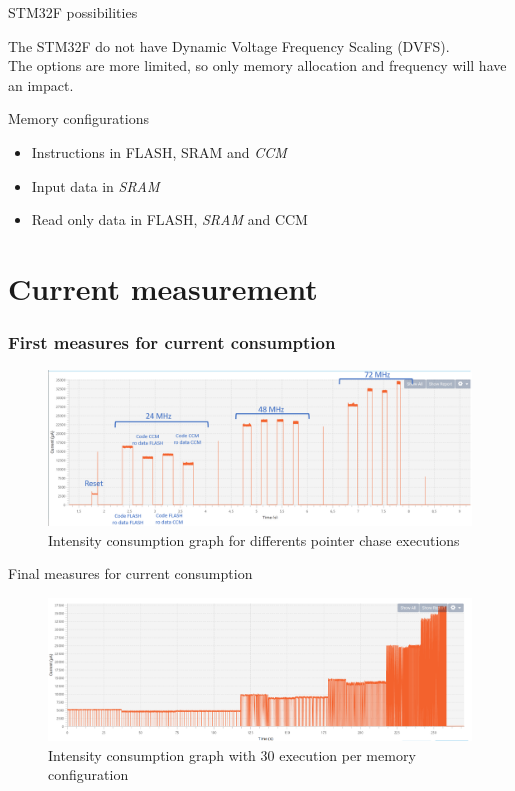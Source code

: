 \documentclass[
	11pt, %
]{beamer}
\begin{document}
\begin{frame}{STM32F possibilities}

\begin{block}{}
	The STM32F do not have Dynamic Voltage Frequency Scaling (DVFS).\\
	The options are more limited, so only memory allocation and frequency will have an impact.
\end{block}
\begin{block}{Memory configurations }
	\begin{itemize}
		\item Instructions in FLASH, SRAM and \emph{CCM}
		\item Input data in \emph{SRAM}
		\item Read only data in FLASH, \emph{SRAM} and CCM
	\end{itemize}
\end{block}
	
\end{frame}


\section{Current measurement} %
\begin{frame}
	\frametitle{First measures for current consumption}
	\begin{figure}
		\centering
        \includegraphics[scale=0.6]{images/pointer_chase_capture_mod.png}
        \caption{Intensity consumption graph for differents pointer chase executions}
	\end{figure}
\end{frame}

\begin{frame}{Final measures for current consumption}
	\begin{figure}
		\centering
        \includegraphics[scale=0.4]{images/pointer_chase30ex.png}
        \caption{Intensity consumption graph with 30 execution per memory configuration}
	\end{figure}
\end{frame}
\end{document}
